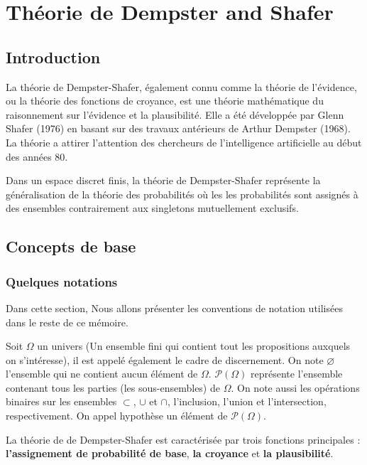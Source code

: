 \chapter{Théorie de Dempster and Shafer}
{}

\section*{Introduction}

La théorie de Dempster-Shafer, également connu comme la théorie de l'évidence,
ou la théorie des fonctions de croyance, est une théorie mathématique du raisonnement
sur l’évidence et la plausibilité. Elle a été développée par Glenn Shafer (1976)
en basant sur des travaux antérieurs de Arthur Dempster (1968). La théorie a attirer
l’attention des chercheurs de l'intelligence artificielle au début des années 80.

Dans un espace discret finis, la théorie de Dempster-Shafer représente la généralisation
de la théorie des probabilités où les les probabilités sont assignés à des ensembles
contrairement aux singletons mutuellement exclusifs.

\section{Concepts de base}

\subsection{Quelques notations}

Dans cette section, Nous allons présenter les conventions de notation utilisées dans le reste de ce mémoire.

Soit $\Omega$ un univers (Un ensemble fini qui contient tout les propositions auxquels on s'intéresse),
il est appelé également le cadre de discernement. On note $\varnothing$ l’ensemble qui
ne contient aucun élément de $\Omega$. $\mathcal{P}(\Omega)$ représente l’ensemble contenant tous
les parties (les sous-ensembles) de $\Omega$. On note aussi les opérations binaires
sur les ensembles $\subset$, $\cup$ et $\cap$, l’inclusion, l’union et l’intersection,
respectivement. On appel hypothèse un élément de $\mathcal{P}(\Omega)$.

La théorie de de Dempster-Shafer est caractérisée par trois fonctions principales : \textbf{l’assignement
de probabilité de base}, \textbf{la croyance} et \textbf{la plausibilité}.


